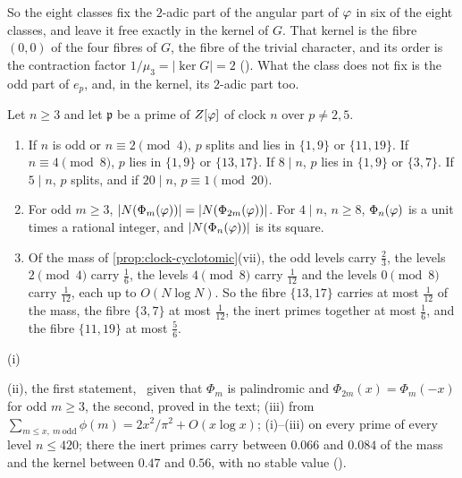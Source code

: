 So the eight classes fix the $2$-adic part of the angular part of $\varphi$ in six of the eight
classes, and leave it free exactly in the kernel of $G$.  That kernel is the fibre $(0,0)$ of the
four fibres of $G$, the fibre of the trivial character, and its order is the contraction factor
$1/\mu_3=|\ker G|=2$ ().
What the class does not fix is the odd part of $e_p$, and, in the kernel, its $2$-adic part too.


\begin{proposition}\label{prop:fibres-levels}
Let $n\geq3$ and let $\mathfrak p$ be a prime of $Z[\varphi]$ of clock $n$ over $p\neq2,5$.
\begin{enumerate}[label=\textup{(\roman*)}]
  \item If $n$ is odd or $n\equiv2\pmod4$, $p$ splits and lies in $\{1,9\}$ or $\{11,19\}$.  If
    $n\equiv4\pmod8$, $p$ lies in $\{1,9\}$ or $\{13,17\}$.  If $8\mid n$, $p$ lies in $\{1,9\}$ or
    $\{3,7\}$.  If $5\mid n$, $p$ splits, and if $20\mid n$, $p\equiv1\pmod{20}$.
  \item For odd $m\geq3$, $|N(\Phi_m(\varphi))|=|N(\Phi_{2m}(\varphi))|$.  For $4\mid n$, $n\geq8$,
    $\Phi_n(\varphi)$ is a unit times a rational integer, and $|N(\Phi_n(\varphi))|$ is its square.
  \item Of the mass of \cref{prop:clock-cyclotomic}\textup{(vii)}, the odd levels carry $\tfrac23$, the
    levels $2\pmod4$ carry $\tfrac16$, the levels $4\pmod8$ carry $\tfrac1{12}$ and the levels
    $0\pmod8$ carry $\tfrac1{12}$, each up to $O(N\log N)$.  So the fibre $\{13,17\}$ carries at most
    $\tfrac1{12}$ of the mass, the fibre $\{3,7\}$ at most $\tfrac1{12}$, the inert primes together at
    most $\tfrac16$, and the fibre $\{11,19\}$ at most $\tfrac56$.
\end{enumerate}
\end{proposition}
(i)

(ii), the first statement, \ given that $\Phi_m$ is palindromic and $\Phi_{2m}(x)=\Phi_m(-x)$ for odd $m\ge3$, the second, proved in the text; (iii) from $\sum_{m\leq x,\ m\ \mathrm{odd}}\phi(m)=2x^2/\pi^2+O(x\log x)$;
(i)--(iii) on every prime of every level $n\leq420$; there the inert primes carry between $0.066$ and
$0.084$ of the mass and the kernel between $0.47$ and $0.56$, with no stable value
().

